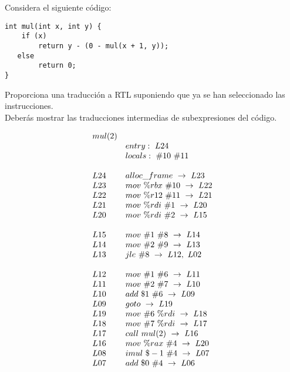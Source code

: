 Considera el siguiente c\'odigo:
\begin{verbatim}
int mul(int x, int y) {
    if (x)
        return y - (0 - mul(x + 1, y));
   else
        return 0;
}
\end{verbatim}
Proporciona una traducci\'on a RTL suponiendo que ya se han seleccionado 
las instrucciones. \\Deber\'as mostrar las traducciones intermedias de 
subexpresiones del c\'odigo.

\[
    \begin{array}{l l}

        mul(2) & \\
          &  entry: \ L24\\
          &  locals: \ \#10 \ \#11\\
         & \\
        L24 & alloc\_frame \ \rightarrow \ L23\\
        L23 & mov \ \%rbx \ \#10 \ \rightarrow \ L22\\
        L22 & mov \ \%r12 \ \#11 \ \rightarrow \ L21\\
        L21 & mov \ \%rdi \ \#1 \ \rightarrow \ L20\\
        L20 & mov \ \%rdi \ \#2 \ \rightarrow \ L15\\
         & \\
        L15 & mov \ \#1 \ \#8 \ \rightarrow \ L14\\
        L14 & mov \ \#2 \ \#9 \ \rightarrow \ L13\\
        L13 & jle \ \#8 \ \rightarrow \ L12, \ L02\\
         & \\
        L12 & mov \ \#1 \ \#6 \ \rightarrow \ L11\\
        L11 & mov \ \#2 \ \#7 \ \rightarrow \ L10\\
        L10 & add \ \$1 \ \#6 \ \rightarrow \ L09\\
        L09 & goto \ \rightarrow \ L19\\
        L19 & mov \ \#6 \ \%rdi \ \rightarrow \ L18\\
        L18 & mov \ \#7 \ \%rdi \ \rightarrow \ L17\\
        L17 & call \ mul(2) \ \rightarrow \ L16\\
        L16 & mov \ \%rax \ \#4 \ \rightarrow \ L20\\
        L08 & imul \ \$-1 \ \#4 \ \rightarrow \ L07\\
        L07 & add \ \$0 \ \#4 \ \rightarrow \ L06\\

\end{array}\]
